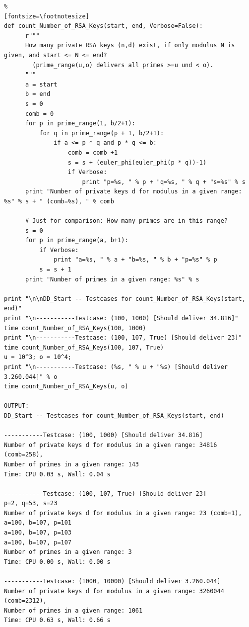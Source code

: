 \begin{refsegment}
\begin{sagecode}
\begin{Verbatim}%
[fontsize=\footnotesize]
def count_Number_of_RSA_Keys(start, end, Verbose=False):
      r"""
      How many private RSA keys (n,d) exist, if only modulus N is given, and start <= N <= end?
        (prime_range(u,o) delivers all primes >=u und < o).
      """
      a = start
      b = end
      s = 0
      comb = 0
      for p in prime_range(1, b/2+1):
          for q in prime_range(p + 1, b/2+1):
              if a <= p * q and p * q <= b:
                  comb = comb +1
                  s = s + (euler_phi(euler_phi(p * q))-1)
                  if Verbose:
                      print "p=%s, " % p + "q=%s, " % q + "s=%s" % s
      print "Number of private keys d for modulus in a given range: %s" % s + " (comb=%s), " % comb

      # Just for comparison: How many primes are in this range?
      s = 0
      for p in prime_range(a, b+1):
          if Verbose:
              print "a=%s, " % a + "b=%s, " % b + "p=%s" % p
          s = s + 1
      print "Number of primes in a given range: %s" % s

print "\n\nDD_Start -- Testcases for count_Number_of_RSA_Keys(start, end)"
print "\n-----------Testcase: (100, 1000) [Should deliver 34.816]"
time count_Number_of_RSA_Keys(100, 1000)
print "\n-----------Testcase: (100, 107, True) [Should deliver 23]"
time count_Number_of_RSA_Keys(100, 107, True)
u = 10^3; o = 10^4;
print "\n-----------Testcase: (%s, " % u + "%s) [Should deliver 3.260.044]" % o
time count_Number_of_RSA_Keys(u, o)

OUTPUT:
DD_Start -- Testcases for count_Number_of_RSA_Keys(start, end)

-----------Testcase: (100, 1000) [Should deliver 34.816]
Number of private keys d for modulus in a given range: 34816 (comb=258),
Number of primes in a given range: 143
Time: CPU 0.03 s, Wall: 0.04 s

-----------Testcase: (100, 107, True) [Should deliver 23]
p=2, q=53, s=23
Number of private keys d for modulus in a given range: 23 (comb=1),
a=100, b=107, p=101
a=100, b=107, p=103
a=100, b=107, p=107
Number of primes in a given range: 3
Time: CPU 0.00 s, Wall: 0.00 s

-----------Testcase: (1000, 10000) [Should deliver 3.260.044]
Number of private keys d for modulus in a given range: 3260044 (comb=2312),
Number of primes in a given range: 1061
Time: CPU 0.63 s, Wall: 0.66 s
\end{Verbatim}
\caption{Wie viele private RSA-Schlüssel d gibt es, wenn man den Bereich für die Schlüssel\-größe n kennt?}
\label{nt_sagesample_Count_RSA_Keys}
\end{sagecode}


\end{refsegment}
